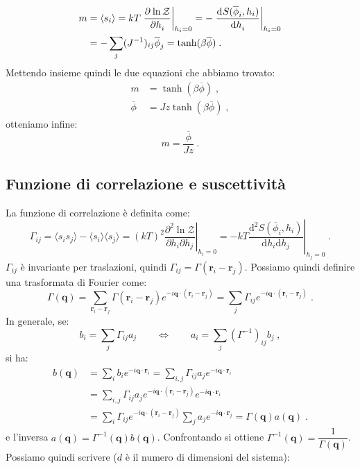 \documentclass[10pt,a4paper]{report}
\theoremstyle{definition}
\newcommand{\pdev}[3][]{\frac{\partial^{#1} #2}{\partial #3^{#1}}}
\newcommand{\dev}[3][]{\frac{\mathrm{d}^{#1} #2}{\mathrm{d} #3^{#1}}}
\numberwithin{equation}{section}
\newcommand{\diff}[1][]{\mathrm{d}#1}
\newcommand{\bra}{\langle}
\newcommand{\ket}{\rangle}
\newcommand{\zpart}{\mathcal{Z}}
\begin{document}
\begin{align}
m &=\bra s_i\ket =kT\left.\pdev{\ln\zpart}{h_i}\right|_{h_i=0}=-\left.\dev{S(\overline{\phi}_i,h_i)}{h_i}\right|_{h_i=0} \notag \\
&=-\sum_j(J^{-1})_{ij}\overline{\phi}_j=\tanh(\beta\overline{\phi})\;.
\end{align}
Mettendo insieme quindi le due equazioni che abbiamo trovato:
\begin{align*}
m &= \tanh(\beta\overline{\phi})\;, \\
\overline{\phi} &= Jz\tanh(\beta\overline{\phi})\;,
\end{align*}
otteniamo infine:
\begin{equation}
m=\frac{\overline{\phi}}{Jz}\;.
\end{equation}
\subsection{Funzione di correlazione e suscettività}
La funzione di correlazione è definita come:
\begin{equation}
\Gamma_{ij}=\bra s_is_j\ket-\bra s_i\ket\bra s_j\ket=(kT)^2\left.\frac{\partial^2\ln\zpart}{\partial h_i\partial h_j}\right|_{h_i=0}=-kT\left.\frac{\diff^2{S(\overline{\phi}_i,h_i)}}{\diff{h_i}\diff{h_j}}\right|_{h_j=0}\;.
\end{equation}
$\Gamma_{ij}$ è invariante per traslazioni, quindi $\Gamma_{ij}=\Gamma(\mathbf{r}_i-\mathbf{r}_j)$. Possiamo quindi definire una trasformata di Fourier come:
\begin{equation}
\Gamma(\mathbf{q})=\sum_{\mathbf{r}_i-\mathbf{r}_j}\Gamma(\mathbf{r}_i-\mathbf{r}_j)e^{-i\mathbf{q}\cdot(\mathbf{r}_i-\mathbf{r}_j)}=\sum_j\Gamma_{ij}e^{-i\mathbf{q}\cdot(\mathbf{r}_i-\mathbf{r}_j)}\;.
\end{equation}
In generale, se:
$$
b_i=\sum_j \Gamma_{ij}a_j\qquad \Longleftrightarrow\qquad a_i=\sum_j(\Gamma^{-1})_{ij}b_j\;,
$$
si ha:
\begin{align*}
b(\mathbf{q})&=\sum_ib_ie^{-i\mathbf{q}\cdot\mathbf{r}_i}=\sum_{i,j}\Gamma_{ij}a_je^{-i\mathbf{q}\cdot\mathbf{r}_i} \\
&=\sum_{i,j}\Gamma_{ij}a_je^{-i\mathbf{q}\cdot(\mathbf{r}_i-\mathbf{r}_j)}e^{-i\mathbf{q}\cdot\mathbf{r}_i} \\
&=\sum_i\Gamma_{ij}e^{-i\mathbf{q}\cdot(\mathbf{r}_i-\mathbf{r}_j)}\sum_ja_je^{-i\mathbf{q}\cdot\mathbf{r}_j}=\Gamma(\mathbf{q})a(\mathbf{q})\;.
\end{align*}
e l'inversa $a(\mathbf{q})=\Gamma^{-1}(\mathbf{q})b(\mathbf{q})$. Confrontando si ottiene $\Gamma^{-1}(\mathbf{q})=\dfrac{1}{\Gamma(\mathbf{q})}$. Possiamo quindi scrivere ($d$ è il numero di dimensioni del sistema):
\end{document}
